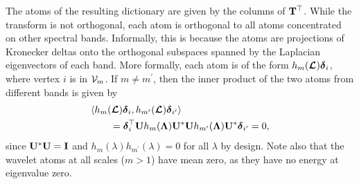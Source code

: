 \documentclass[journal, 10pt]{IEEEtran}
\begin{document}
The atoms of the resulting dictionary are given by the columns of ${\bf T}^{\top}$. While the transform is not orthogonal, each atom is orthogonal to all atoms concentrated on other spectral bands. Informally, this is because the atoms are projections of Kronecker deltas onto the orthogonal subspaces spanned by the Laplacian eigenvectors of each band. More formally, each atom is of the form $h_m(\boldsymbol{\mathcal{L}}){\boldsymbol \delta}_i$, where vertex $i$ is in ${\cal V}_m$. If $m \neq m^{\prime}$, then the inner product of the two atoms from different bands is given by
\begin{align} \label{Eq:ortho_bands}
&\langle h_m(\L){\boldsymbol \delta}_i , h_{m^{\prime}}(\L){\boldsymbol \delta}_{i^{\prime}} \rangle \nonumber \\
&~~~~~~= {\boldsymbol \delta}_i^{\top} {\bf U} h_m({\boldsymbol \Lambda}) {\bf U}^* {\bf U} h_{m^{\prime}}({\boldsymbol \Lambda}) {\bf U}^* {\boldsymbol \delta}_{i^{\prime}}= 0,
\end{align}
since ${\bf U}^* {\bf U}={\bf I}$ and $h_m(\lambda)h_{m^{\prime}}(\lambda)=0$ for all $\lambda$ by design.
Note also that the wavelet atoms at all scales ($m>1$) have mean zero, as they have no energy at eigenvalue zero.
\end{document}

